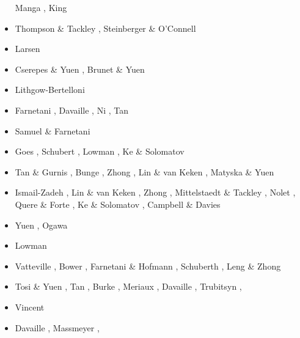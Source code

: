 \begin{scriptsize}
\begin{itemize}
                            Manga \cite{mang97}, King \cite{king97} 
\item[\nineteenninetyeight] Thompson \& Tackley \cite{thta98}, Steinberger \& O'Connell \cite{stoc98}
\item[\nineteenninetynine] Larsen \etal \cite{lays99}
\item[\twothousand] Cserepes \& Yuen \cite{csyu00}, Brunet \& Yuen \cite{bryu00}
\item[\twothousandone] Lithgow-Bertelloni \cite{lirc01}
\item[\twothousandtwo] Farnetani \etal \cite{falt02}, Davaille \etal \cite{dagl02},
                       Ni \etal \cite{nitg02}, Tan \etal \cite{tagh02}
\item[\twothousandthree] Samuel \& Farnetani \cite{safa03}
\item[\twothousandfour] Goes \etal \cite{goch04}, Schubert \etal \cite{scmo04}, Lowman \etal \cite{lokg04},
                        Ke \& Solomatov \cite{keso04} 
\item[\twothousandfive] Tan \& Gurnis \cite{tagu05}, Bunge \cite{bung05}, Zhong \cite{zhon05}, 
                        Lin \& van Keken \cite{liva05}, Matyska \& Yuen \cite{mayu05}
\item[\twothousandsix] Ismail-Zadeh \etal \cite{isst06}, Lin \& van Keken \cite{liva06a,liva06b}, 
                       Zhong \cite{zhon06}, Mittelstaedt \& Tackley \cite{mita06},
                       Nolet \etal \cite{nokm06}, Quere \& Forte \cite{qufo06}, 
                       Ke \& Solomatov \cite{keso06}, Campbell \& Davies \cite{cada06}
\item[\twothousandseven] Yuen \etal \cite{yumh07}, Ogawa \cite{ogaw07}
\item[\twothousandeight] Lowman \etal \cite{logg08} 
\item[\twothousandnine] Vatteville \etal \cite{vavl09}, Bower \etal \cite{bogj09},
                        Farnetani \& Hofmann \cite{faho09}, Schuberth \etal \cite{scbs09b},
                        Leng \& Zhong \cite{lezh09}
\item[\twothousandeleven] Tosi \& Yuen \cite{toyu11}, Tan \etal \cite{talz11},
                          Burke \cite{burk11}, Meriaux \etal \cite{memm11}, 
                          Davaille \etal \cite{dalt11}, Trubitsyn \etal \cite{tree11},
\item[\twothousandtwelve] Vincent \etal{} \cite{viym12}
\item[\twothousandthirteen] Davaille \etal \cite{dagm13}, Massmeyer \etal \cite{madd13},

\end{itemize}
\end{scriptsize}
